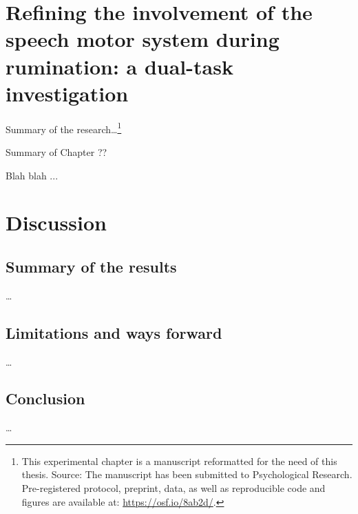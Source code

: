 \documentclass[a4paper,11pt,oneside,oldfontcommands]{memoir}
\let\rmarkdownfootnote\footnote%
\def\footnote{\protect\rmarkdownfootnote}
\newcommand\getcurrentref[1]{
 \ifnumequal{\value{#1}}{0}
  {??}
  {\the\value{#1}}
}
\begin{document}
\chapter{Refining the involvement of the speech motor system during
rumination: a dual-task
investigation}\label{refining-the-involvement-of-the-speech-motor-system-during-rumination-a-dual-task-investigation}

Summary of the research\ldots{}\footnote{This experimental chapter is a
  manuscript reformatted for the need of this thesis. Source: The
  manuscript has been submitted to Psychological Research.
  Pre-registered protocol, preprint, data, as well as reproducible code
  and figures are available at: \url{https://osf.io/8ab2d/}.}

\begin{summary}{Summary of Chapter\getcurrentref{chapter}}

Blah blah ...

\end{summary}

\chapter{Discussion}\label{discussion-1}

\section{Summary of the results}\label{summary-of-the-results}

\ldots{}

\section{Limitations and ways
forward}\label{limitations-and-ways-forward}

\ldots{}

\section{Conclusion}\label{conclusion}

\ldots{}

\noindent
\setlength{\parindent}{-0.20in} \setlength{\leftskip}{0.20in}
\setlength{\parskip}{8pt}


\end{document}
